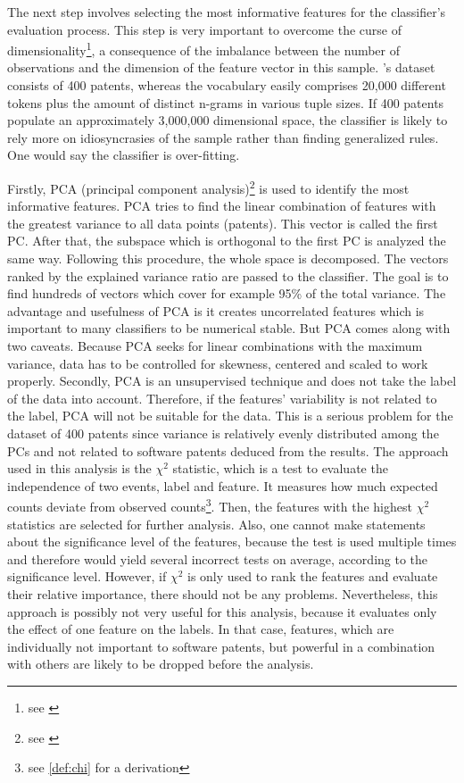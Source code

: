 \documentclass[12pt, a4paper]{scrartcl}
\theoremstyle{definition}
\begin{document}
The next step involves selecting the most informative features for the
classifier's evaluation process. This step is very important to overcome the
curse of dimensionality\footnote{see \cite{kulkarni2011elementary}}, a
consequence of the imbalance between the number of observations and the
dimension of the feature vector in this sample.
\citeauthor{bessen2007empirical}'s dataset consists of 400 patents, whereas the
vocabulary easily comprises 20,000 different tokens plus the amount of distinct
n-grams in various tuple sizes. If 400 patents populate an approximately
3,000,000 dimensional space, the classifier is likely to rely more on
idiosyncrasies of the sample rather than finding generalized rules. One would
say the classifier is over-fitting.

Firstly, PCA (principal component analysis)\footnote{see
\cite{kuhn2013applied}} is used to identify the most informative features. PCA
tries to find the linear combination of features with the greatest variance to
all data points (patents). This vector is called the first PC. After that, the
subspace which is orthogonal to the first PC is analyzed the same way.
Following this procedure, the whole space is decomposed. The vectors ranked by
the explained variance ratio are passed to the classifier. The goal is to find
hundreds of vectors which cover for example 95\% of the total variance. The
advantage and usefulness of PCA is it creates uncorrelated features which is
important to many classifiers to be numerical stable. But PCA comes along with
two caveats. Because PCA seeks for linear combinations with the maximum
variance, data has to be controlled for skewness, centered and scaled to work
properly. Secondly, PCA is an unsupervised technique and does not take the
label of the data into account. Therefore, if the features' variability is not
related to the label, PCA will not be suitable for the data. This is a serious
problem for the dataset of 400 patents since variance is relatively evenly
distributed among the PCs and not related to software patents deduced from the
results. The approach used in this analysis is the $\chi^2$ statistic, which is
a test to evaluate the independence of two events, label and feature. It
measures how much expected counts deviate from observed counts\footnote{see
\ref{def:chi} for a derivation}. Then, the features with the highest $\chi^2$
statistics are selected for further analysis. Also, one cannot make statements
about the significance level of the features, because the test is used multiple
times and therefore would yield several incorrect tests on average, according
to the significance level. However, if $\chi^2$ is only used to rank the
features and evaluate their relative importance, there should not be any
problems. Nevertheless, this approach is possibly not very useful for this
analysis, because it evaluates only the effect of one feature on the labels. In
that case, features, which are individually not important to software patents,
but powerful in a combination with others are likely to be dropped before the
analysis.
\end{document}
